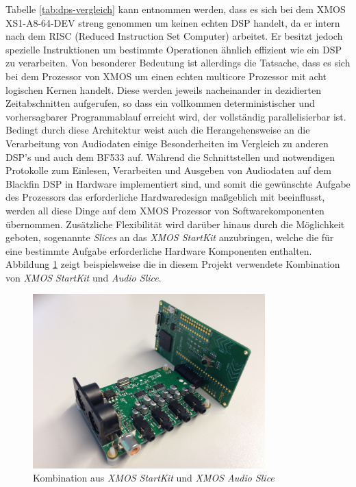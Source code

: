 \documentclass[paper=a4, fontsize=12pt]{scrartcl}
\numberwithin{equation}{section}		%
\numberwithin{figure}{section}			%
\numberwithin{table}{section}				%
\begin{document}
Tabelle \ref{tab:dps-vergleich} kann entnommen werden, dass es sich bei dem XMOS XS1-A8-64-DEV streng genommen um keinen echten DSP handelt, da er intern nach dem RISC (Reduced Instruction Set Computer) arbeitet. Er besitzt jedoch spezielle Instruktionen um bestimmte Operationen ähnlich effizient wie ein DSP zu verarbeiten.
Von besonderer Bedeutung ist allerdings die Tatsache, dass es sich bei dem Prozessor von XMOS um einen echten multicore Prozessor mit acht logischen Kernen handelt. Diese werden jeweils nacheinander in dezidierten Zeitabschnitten aufgerufen, so dass ein vollkommen deterministischer und vorhersagbarer Programmablauf erreicht wird, der vollständig parallelisierbar ist.
Bedingt durch diese Architektur weist auch die Herangehensweise an die Verarbeitung von Audiodaten einige Besonderheiten im Vergleich zu anderen DSP's und auch dem BF533 auf. Während die Schnittstellen und notwendigen Protokolle zum Einlesen, Verarbeiten und Ausgeben von Audiodaten auf dem Blackfin DSP in Hardware implementiert sind, und somit die gewünschte Aufgabe des Prozessors das erforderliche Hardwaredesign maßgeblich mit beeinflusst, werden all diese Dinge auf dem XMOS Prozessor von Softwarekomponenten übernommen. Zusätzliche Flexibilität wird darüber hinaus durch die Möglichkeit geboten, sogenannte \textit{Slices} an das \textit{XMOS StartKit} anzubringen, welche die für eine bestimmte Aufgabe erforderliche Hardware Komponenten enthalten. Abbildung \ref{fig:audioKit} zeigt beispielsweise die in diesem Projekt verwendete Kombination von \textit{XMOS StartKit} und \textit{Audio Slice}.

\begin{figure}[htb]
  \centering
  \label{fig:audioKit}
  \includegraphics[width=0.8\textwidth]{graphics/IMG_1119}
  \caption{Kombination aus \textit{XMOS StartKit} und \textit{XMOS Audio Slice}}
\end{figure}
 
\end{document}
